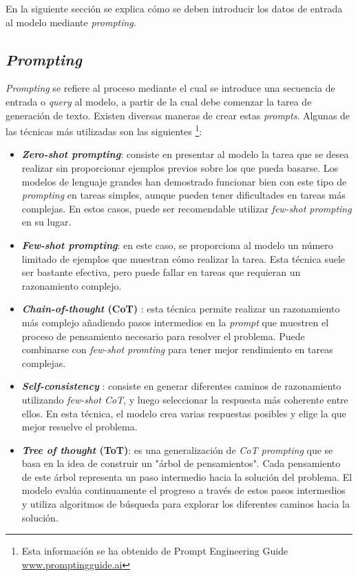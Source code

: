 \documentclass[11pt,spanish,listoffigures,listoftables]{tfgetsinf}
\begin{document}
En la siguiente sección se explica cómo se deben introducir los datos de entrada al modelo mediante \textit{prompting}.

\subsection{\textit{Prompting}} \label{prompting}

\textit{Prompting} se refiere al proceso mediante el cual se introduce una secuencia de entrada o \textit{query} al modelo, a partir de la cual debe comenzar la tarea de generación de texto. Existen diversas maneras de crear estas \textit{prompts}. Algunas de las técnicas más utilizadas son las siguientes \footnote{Esta  información se ha obtenido de Prompt Engineering Guide \url{www.promptingguide.ai}}:

\begin{itemize}
	\item \textbf{\textit{Zero-shot prompting}}: consiste en presentar al modelo la tarea que se desea realizar sin proporcionar ejemplos previos sobre los que pueda basarse. Los modelos de lenguaje grandes han demostrado funcionar bien con este tipo de \textit{prompting} en tareas simples, aunque pueden tener dificultades en tareas más complejas. En estos casos, puede ser recomendable utilizar \textit{few-shot prompting} en su lugar.
	\item \textbf{\textit{Few-shot prompting}}: en este caso, se proporciona al modelo un número limitado de ejemplos que muestran cómo realizar la tarea. Esta técnica suele ser bastante efectiva,  pero puede fallar en tareas que requieran un razonamiento complejo.
	\item \textbf{\textit{Chain-of-thought} (CoT)} \cite{wei2023chainofthoughtpromptingelicitsreasoning}: esta técnica permite realizar un razonamiento más complejo añadiendo pasos intermedios en la \textit{prompt} que muestren el proceso de pensamiento necesario para resolver el problema. Puede combinarse con \textit{few-shot promting} para tener mejor rendimiento en tareas complejas.
	\item \textbf{\textit{Self-consistency}} \cite{wang2023selfconsistencyimproveschainthought}: consiste en generar diferentes caminos de razonamiento utilizando \textit{few-shot CoT}, y luego seleccionar la respuesta más coherente entre ellos. En esta técnica, el modelo crea varias respuestas posibles y elige la que mejor resuelve el problema.
	\item \textbf{\textit{Tree of thought} (ToT)}:  es una generalización de \textit{CoT prompting} que se basa en la idea de construir un "árbol de pensamientos". Cada pensamiento de este árbol representa un paso intermedio hacia la solución del problema. El modelo evalúa continuamente el progreso a través de estos pasos intermedios y utiliza algoritmos de búsqueda para explorar los diferentes caminos hacia la solución.
\end{itemize}
\end{document}
